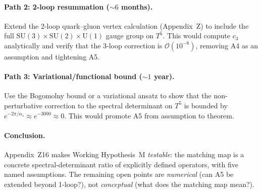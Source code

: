 \paragraph{Path 2: 2-loop resummation ($\sim\!6$ months).}
Extend the 2-loop quark--gluon vertex calculation (Appendix~Z) to
include the full $\mathrm{SU}(3)\times\mathrm{SU}(2)\times\mathrm{U}(1)$
gauge group on $T^5$. This would compute $c_3$ analytically and
verify that the 3-loop correction is $\mathcal{O}(10^{-8})$, removing
A4 as an assumption and tightening A5.

\paragraph{Path 3: Variational/functional bound ($\sim\!1$ year).}
Use the Bogomolny bound or a variational ansatz to show that the
non-perturbative correction to the spectral determinant on $T^5$ is
bounded by $e^{-2\pi/\alpha_s}\approx e^{-3000}\approx 0$.
This would promote A5 from assumption to theorem.

\paragraph{Conclusion.}
Appendix~Z16 makes Working Hypothesis~M \emph{testable}: the
matching map is a concrete spectral-determinant ratio of explicitly
defined operators, with five named assumptions. The remaining open
points are \emph{numerical} (can A5 be extended beyond 1-loop?),
not \emph{conceptual} (what does the matching map mean?).
